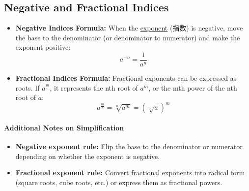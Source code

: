 
\subsection{Negative and Fractional Indices}
\begin{itemize}
    \item \textbf{Negative Indices Formula:} When the \underline{exponent} (指数) is negative, move the base to the denominator
    (or denominator to numerator) and make the exponent positive:
    \begin{equation}
        a^{-n} = \frac{1}{a^n}
    \end{equation}
    \item \textbf{Fractional Indices Formula:} Fractional exponents can be expressed as roots. If $a^{\frac{m}{n}}$, it
    represents the nth root of $a^m$, or the mth power of the nth root of $a$:
    \begin{equation}
        a^{\frac{m}{n}} = \sqrt[n]{a^m} = (\sqrt[n]{a})^m
    \end{equation}
\end{itemize}

\paragraph{Additional Notes on Simplification}
\begin{itemize}
    \item \textbf{Negative exponent rule:} Flip the base to the denominator or numerator depending on whether the exponent is
    negative.
    \item \textbf{Fractional exponent rule:} Convert fractional exponents into radical form (square roots, cube roots, etc.) or
    express them as fractional powers.
\end{itemize}